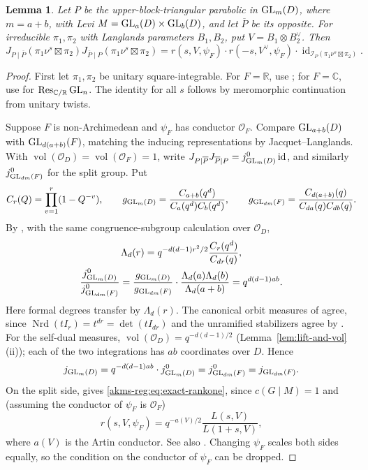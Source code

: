 \documentclass[11pt,reqno]{amsart}
\theoremstyle{plain}
\newtheorem{lem}[thm]{Lemma}
\theoremstyle{definition}
\newcommand{\C}{\mathbb{C}}
\newcommand{\R}{\mathbb{R}}
\newcommand{\cO}{\mathcal{O}}
\newcommand{\GL}{\tu{GL}}
\newcommand{\tu}{\textup}
\numberwithin{equation}{subsection}
\begin{document}
\begin{lem}\label{akms-reg:lem:exact-rankone}
Let $P$ be the upper-block-triangular parabolic in $\GL_m(D)$, where $m=a+b$, 
with Levi $M=\GL_a(D)\times\GL_b(D)$, and let $\overline P$ be its
opposite. For irreducible $\pi_1,\pi_2$ with Langlands parameters
$B_1,B_2$, put $V=B_1\otimes B_2^\vee$. Then
\begin{equation}\label{akms-reg:eq:exact-rankone}
 J_{P\mid\overline P}(\pi_1\nu^s\boxtimes\pi_2)
 J_{\overline P\mid P}(\pi_1\nu^s\boxtimes\pi_2)
 =r(s,V,\psi_F)\cdot r(-s,V^\vee,\psi_F)\cdot \operatorname{id}_{\mathcal I_P(\pi_1\nu^s\boxtimes\pi_2)}.
\end{equation}
\end{lem}
\begin{proof}
First let $\pi_1,\pi_2$ be unitary square-integrable.
For $F=\R$, use \cite[Lem.~2.2.1 and its proof]{KMSW}; for
$F=\C$, use \cite[Thm.~2.1, \S3 (3.2)]{ArtIOR1} for
$\operatorname{Res}_{\C/\R}\GL_n$. The identity for all $s$ follows
by meromorphic continuation from unitary twists.

Suppose $F$ is non-Archimedean and $\psi_F$ has conductor $\cO_F$.
Compare $\GL_{a+b}(D)$ with $\GL_{d(a+b)}(F)$, matching the
inducing representations by Jacquet--Langlands. With
$\operatorname{vol}(\cO_D)=\operatorname{vol}(\cO_F)=1$, write
$J_{P\mid\overline P}J_{\overline P\mid P}=j_{\GL_m(D)}^0\operatorname{id}$,
and similarly $j_{\GL_{dm}(F)}^0$ for the split group.
Put
\[
 C_r(Q)=\prod_{v=1}^r(1-Q^{-v}),\qquad
 g_{\GL_{m}(D)}=\frac{C_{a+b}(q^d)}{C_a(q^d)C_b(q^d)},\qquad
 g_{\GL_{dm}(F)}=\frac{C_{d(a+b)}(q)}{C_{da}(q)C_{db}(q)}.
\]
By \cite[\S2 (1), Thms.~3.1, 7.2]{AubertPlymen}, with the same
congruence-subgroup calculation over $\cO_D$,
\begin{gather*}
 \Lambda_d(r)=q^{-d(d-1)r^2/2}\frac{C_r(q^d)}{C_{dr}(q)},\\
 \frac{j_{\GL_m(D)}^0}{j_{\GL_{dm}(F)}^0}
 =\frac{g_{\GL_{m}(D)}}{g_{\GL_{dm}(F)}}\cdot
   \frac{\Lambda_d(a)\Lambda_d(b)}{\Lambda_d(a+b)}
 =q^{d(d-1)ab}.
\end{gather*}
Here formal degrees transfer by $\Lambda_d(r)$.
The canonical orbit measures of \cite[\S2]{AubertPlymen} agree,
since $\operatorname{Nrd}(tI_r)=t^{dr}=\det(tI_{dr})$ and the
unramified stabilizers agree by \cite[\S7 (48)]{AubertPlymen}.
For the self-dual measures,
$\operatorname{vol}(\cO_D)=q^{-d(d-1)/2}$
(Lemma~\ref{lem:lift-and-vol}(ii)); each of the two integrations has
$ab$ coordinates over $D$. Hence
\[
 j_{\GL_m(D)}=q^{-d(d-1)ab}\cdot j_{\GL_m(D)}^0=j_{\GL_{dm}(F)}^0=j_{\GL_{dm}(F)}.
\]
On the split side, \cite[\S3 (4), \S4 (7)--(9)]{AubertPlymen}
gives \eqref{akms-reg:eq:exact-rankone}, since $c(G\mid M)=1$ and (assuming the conductor of $\psi_F$ is $\mathcal O_F$)
\[
 r(s,V,\psi_F)=q^{-a(V)/2}\frac{L(s,V)}{L(1+s,V)},
\]
where $a(V)$ is the Artin conductor. See also
\cite[(25.1), Lem.~25.2, p.~169]{Art05}.
Changing $\psi_F$ scales both sides equally, so the condition on the conductor of $\psi_F$ can be dropped.


\end{proof}
\end{document}
